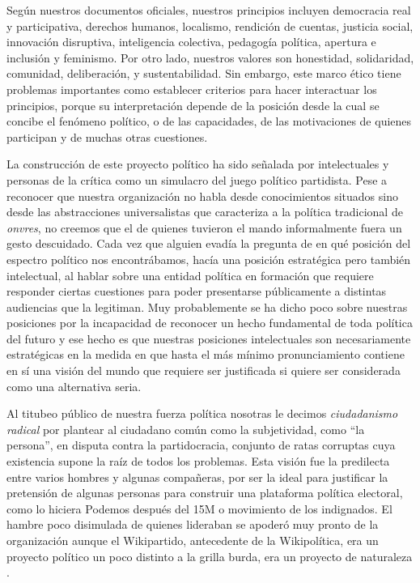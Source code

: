 Según nuestros documentos oficiales,\addref{} nuestros principios incluyen democracia real y participativa, derechos humanos, localismo, rendición de cuentas, justicia social, innovación disruptiva, inteligencia colectiva, pedagogía política, apertura e inclusión y feminismo. Por otro lado, nuestros valores son honestidad, solidaridad, comunidad, deliberación,  y sustentabilidad. Sin embargo, este marco ético tiene problemas importantes como establecer criterios para hacer interactuar los principios, porque su interpretación depende de la posición desde la cual se concibe el fenómeno político, o de las capacidades, de las motivaciones de quienes participan y de muchas otras cuestiones.

La construcción de este proyecto político ha sido señalada por intelectuales y personas de la crítica como un simulacro  del juego político partidista. Pese a reconocer que nuestra organización no habla desde conocimientos situados sino desde las abstracciones universalistas que caracteriza a la política tradicional de \emph{onvres}, no creemos que el  de quienes tuvieron el mando informalmente fuera un gesto descuidado. Cada vez que alguien evadía la pregunta de en qué posición del espectro político nos encontrábamos, hacía una posición estratégica pero también intelectual, al hablar sobre una entidad política en formación que requiere responder ciertas cuestiones para poder presentarse públicamente a distintas audiencias que la legitiman. Muy probablemente se ha dicho poco sobre nuestras posiciones por la incapacidad de reconocer un hecho fundamental de toda política del futuro y ese hecho es que nuestras posiciones intelectuales son necesariamente estratégicas en la medida en que hasta el más mínimo pronunciamiento contiene en sí una visión del mundo que requiere ser justificada si quiere ser considerada como una alternativa seria.

Al titubeo público de nuestra fuerza política nosotras le decimos \emph{ciudadanismo radical} por plantear al ciudadano común como la subjetividad, como \enquote{la persona},\revquotes{} en disputa contra la partidocracia,  conjunto de ratas corruptas cuya existencia supone la raíz de todos los problemas. Esta visión fue la predilecta entre varios hombres y algunas compañeras, por ser la ideal para justificar la pretensión de algunas personas para construir una plataforma política electoral, como lo hiciera Podemos después del 15M o movimiento de los indignados. El hambre poco disimulada de quienes lideraban se apoderó muy pronto de la organización aunque el Wikipartido, antecedente de la Wikipolítica, era un proyecto político un poco distinto a la grilla burda, era un proyecto de naturaleza .

